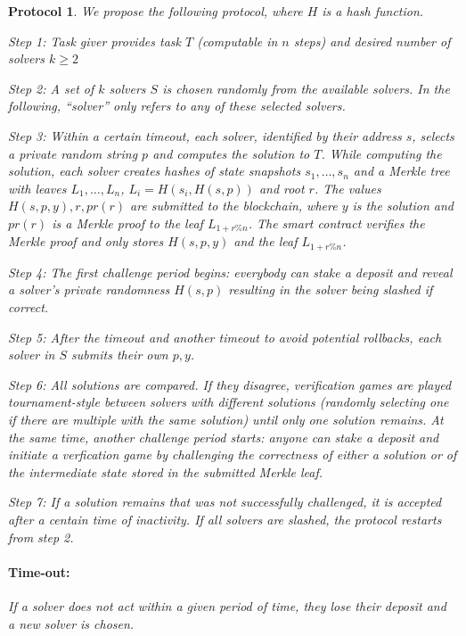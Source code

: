 \documentclass[a4paper]{article}
\newtheorem{protocol}[dummy]{Protocol}
\begin{document}
\begin{protocol}
We propose the following protocol, where $H$ is a hash function.

\emph{Step 1:} Task giver provides task $T$ (computable in $n$ steps) and desired
number of solvers $k \ge 2$

\emph{Step 2:} A set of $k$ solvers $S$ is chosen randomly from the available solvers.
In the following, ``solver'' only refers to any of these selected solvers.

\emph{Step 3:} Within a certain timeout, each solver, identified by their address $s$, selects
a private random string $p$ and computes
the solution to $T$. While computing the solution, each solver creates hashes of state
snapshots $s_1, \dots, s_n$ and a Merkle tree
with leaves $L_1, \dots, L_n$, $L_i = H(s_i, H(s, p))$ and root $r$.
The values $H(s, p, y), r, pr(r)$ are submitted to the blockchain, where $y$ is the solution and $pr(r)$ is a Merkle proof
to the leaf $L_{1 + r \% n}$. The smart contract verifies the Merkle proof and only stores
$H(s, p, y)$ and the leaf $L_{1 + r \% n}$.

\emph{Step 4:} The first challenge period begins: everybody can stake a deposit and reveal a solver's private
randomness $H(s, p)$ resulting in the solver being slashed if correct.

\emph{Step 5:} After the timeout and another timeout to avoid potential rollbacks,
each solver in $S$ submits their own $p, y$.

\emph{Step 6:} All solutions are compared. If they disagree, verification games are played
tournament-style between solvers with different solutions (randomly selecting one
if there are multiple with the same solution) until only one solution remains.
At the same time, another challenge period starts: anyone can stake a deposit and
initiate a verfication game by challenging the correctness of either
a solution or of the intermediate state stored in the submitted Merkle leaf.

\emph{Step 7:} If a solution remains that was not successfully challenged, it is
accepted after a centain time of inactivity. If all solvers are slashed,
the protocol restarts from step 2.

\paragraph{Time-out:}
If a solver does not act within a given period of time, they lose
their deposit and a new solver is chosen.


\end{protocol}
\end{document}
